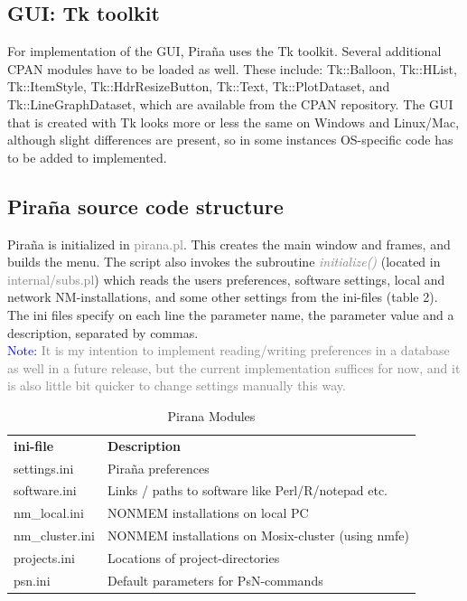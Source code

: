 \documentclass[a4,11pt]{report}
\begin{document}
\subsection{GUI: Tk toolkit} For implementation of the GUI, Pira\~na
uses the Tk toolkit. Several additional CPAN modules have to be loaded
as well. These include: Tk::Balloon, Tk::HList, Tk::ItemStyle,
Tk::HdrResizeButton, Tk::Text, Tk::PlotDataset, and
Tk::LineGraphDataset, which are available from the CPAN
repository. The GUI that is created with Tk looks more or less the
same on Windows and Linux/Mac, although slight differences are
present, so in some instances OS-specific code has to be added to
implemented.


\subsection{Pira\~na source code structure} Pira\~na is initialized in
\textcolor{Grey}{pirana.pl}. This creates the main window and frames,
and builds the menu. The script also invokes the subroutine
\textcolor{Grey}{\textit{initialize()}} (located in
\textcolor{Grey}{internal/subs.pl}) which reads the users preferences,
software settings, local and network NM-installations, and some other
settings from the ini-files (table 2). The ini files specify on each
line the parameter name, the parameter value and a description,
separated by commas.\\

\scriptsize
\noindent\textcolor{Blue}{Note:} \textcolor{Grey}{It is my intention
to implement reading/writing preferences in a database as well in a
future release, but the current implementation suffices for now, and
it is also little bit quicker to change settings manually this way.}\\
\normalsize

\begin{table}[h] \centering {}
  \begin{tabular}{ll} \textbf{ini-file} & \textbf{Description} \\
    \small {settings.ini} & \small {Pira\~na preferences} \\
    \small {software.ini} & \small {Links / paths to software like
      Perl/R/notepad etc.} \\
    \small {nm\_local.ini} & \small {NONMEM installations on local PC} \\
    \small {nm\_cluster.ini} & \small {NONMEM installations on Mosix-cluster (using nmfe)} \\
    \small {projects.ini} & \small {Locations of project-directories} \\
    \small {psn.ini} & \small {Default parameters for PsN-commands} \\
  \end{tabular}
  \caption{Pirana Modules}
  \label{tab:PiranaModules}
\end{table}
\end{document}
